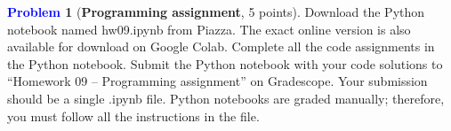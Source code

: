 \documentclass[letterpaper,11pt]{article}
\theoremstyle{plain}
\theoremstyle{definition}
\newtheorem{problem}{\textcolor{blue}{Problem}}
\theoremstyle{plain}
\begin{document}
\begin{problem}[{\bf Programming assignment}, 5 points]Download the Python notebook named hw09.ipynb from Piazza. The exact online version is also available for download on Google Colab. Complete all the code assignments in the Python notebook. Submit the Python notebook with your code solutions to ``Homework 09 -- Programming assignment'' on Gradescope. Your submission should be a single .ipynb file. Python notebooks are graded manually; therefore, you must follow all the instructions in the file.
\end{problem}
\end{document}
